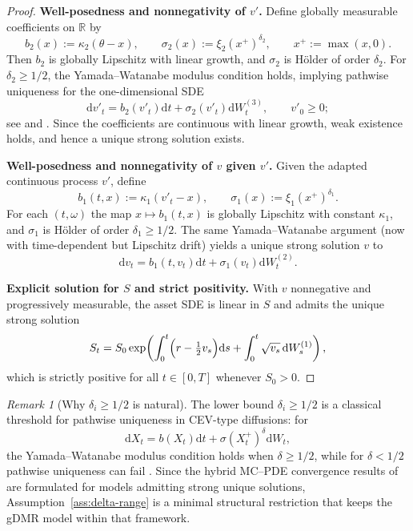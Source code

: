 \documentclass[10pt]{article}
\theoremstyle{plain}
\theoremstyle{definition}
\theoremstyle{remark}
\newtheorem{remark}[theorem]{Remark}
\newcommand{\dd}{\mathrm d}
\newcommand{\R}{\mathbb R}
\begin{document}
\begin{proof}
\textbf{Well-posedness and nonnegativity of $v'$.}
Define globally measurable coefficients on $\R$ by
\[
b_2(x):=\kappa_2(\theta-x),\qquad \sigma_2(x):=\xi_2(x^+)^{\delta_2},\qquad x^+:=\max(x,0).
\]
Then $b_2$ is globally Lipschitz with linear growth, and $\sigma_2$ is H\"older of order $\delta_2$.
For $\delta_2\ge 1/2$, the Yamada--Watanabe modulus condition holds, implying pathwise uniqueness for the
one-dimensional SDE
\[
\dd v'_t=b_2(v'_t)\dd t+\sigma_2(v'_t)\dd W^{(3)}_t,\qquad v'_0\ge 0;
\]
see \citet{yamada1971uniqueness} and \citet[Ch.~5]{karatzas1991brownian}. Since the coefficients are continuous
with linear growth, weak existence holds, and hence a unique strong solution exists.



\medskip
\textbf{Well-posedness and nonnegativity of $v$ given $v'$.}
Given the adapted continuous process $v'$, define
\[
b_1(t,x):=\kappa_1(v'_t-x),\qquad \sigma_1(x):=\xi_1(x^+)^{\delta_1}.
\]
For each $(t,\omega)$ the map $x\mapsto b_1(t,x)$ is globally Lipschitz with constant $\kappa_1$, and $\sigma_1$ is
H\"older of order $\delta_1\ge 1/2$. The same Yamada--Watanabe argument (now with time-dependent but Lipschitz drift)
yields a unique strong solution $v$ to $$\dd v_t=b_1(t,v_t)\dd t+\sigma_1(v_t)\dd W^{(2)}_t.$$


\medskip
\textbf{Explicit solution for $S$ and strict positivity.}
With $v$ nonnegative and progressively measurable, the asset SDE is linear in $S$ and admits the unique strong solution
\[
S_t
= S_0 \exp\!\left(
\int_0^t \Bigl(r-\tfrac12 v_s\Bigr)\dd s + \int_0^t \sqrt{v_s}\,\dd W^{(1)}_s
\right),
\]
which is strictly positive for all $t\in[0,T]$ whenever $S_0>0$.
\end{proof}

\begin{remark}[Why $\delta_i\ge 1/2$ is natural]\label{rem:delta-half}
The lower bound $\delta_i\ge 1/2$ is a classical threshold for pathwise uniqueness in CEV-type diffusions:
for $$\dd X_t=b(X_t)\dd t+\sigma (X_t^+)^\delta \dd W_t,$$ the Yamada--Watanabe modulus condition holds when $\delta\ge 1/2$,
while for $\delta<1/2$ pathwise uniqueness can fail \citep{yamada1971uniqueness}. Since the hybrid MC--PDE convergence results
of \citet{farahany2020mixing} are formulated for models admitting strong unique solutions, Assumption~\ref{ass:delta-range} is a
minimal structural restriction that keeps the gDMR model within that framework.
\end{remark}
\end{document}
